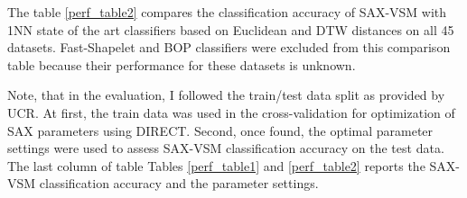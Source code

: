 The table \ref{perf_table2} compares the classification accuracy of SAX-VSM with 
1NN state of the art classifiers based on Euclidean and DTW distances on all 45 datasets. 
Fast-Shapelet and BOP classifiers were excluded from this comparison table because their 
performance for these datasets is unknown.

Note, that in the evaluation, I followed the train/test data split as provided by UCR. 
At first, the train data was used in the cross-validation for optimization of SAX parameters 
using \mbox{DIRECT}. Second, once found, the optimal parameter settings were used to assess SAX-VSM 
classification accuracy on the test data. 
The last column of table Tables \ref{perf_table1} and \ref{perf_table2} reports the SAX-VSM 
classification accuracy and the parameter settings.

\newpage

